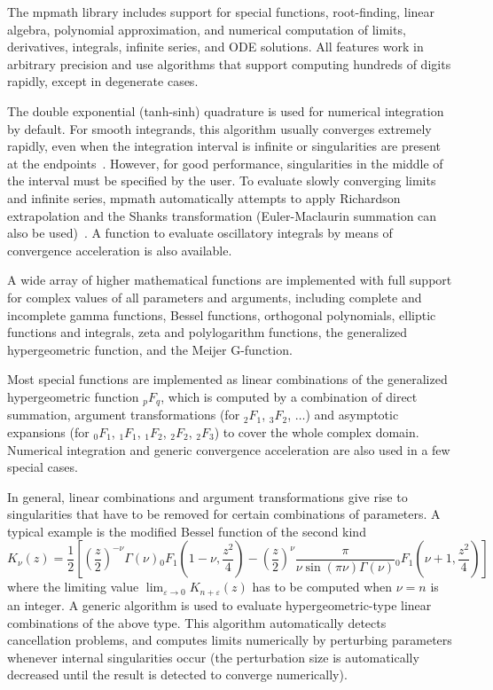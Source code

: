 The mpmath library includes support for
special functions, root-finding, linear algebra, polynomial approximation,
and numerical computation of limits, derivatives, integrals, infinite
series, and ODE solutions. All features work in arbitrary precision
and use algorithms that support computing hundreds of digits rapidly,
except in degenerate cases.

The double exponential (tanh-sinh) quadrature is used for numerical
integration by default. For smooth integrands, this algorithm usually
converges extremely rapidly, even when the integration interval is infinite
or singularities are present at the endpoints~\cite{takahasi1974double,bailey2005comparison}.
However, for good performance, singularities
in the middle of the interval must be specified
by the user.
To evaluate slowly converging limits and infinite series, mpmath
automatically attempts to apply Richardson extrapolation and the
Shanks transformation
(Euler-Maclaurin summation can also be used)~\cite{BenderOrszag1999}.
A function to evaluate oscillatory integrals by means of convergence
acceleration is also available.

A wide array of higher mathematical functions are implemented
with full support for complex values of all parameters and arguments,
including complete and incomplete gamma functions,
Bessel functions, orthogonal polynomials, elliptic functions and integrals,
zeta and polylogarithm functions,
the generalized hypergeometric function, and the Meijer G-function.

Most special functions are implemented as linear 
combinations of the generalized hypergeometric function ${}_pF_q$,
which is computed by a combination of direct summation,
argument transformations (for ${}_2F_1$, ${}_3F_2$, $\ldots$)
and asymptotic expansions
(for ${}_0F_1$, ${}_1F_1$, ${}_1F_2$, ${}_2F_2$, ${}_2F_3$)
to cover the whole complex domain.
Numerical integration and generic convergence acceleration
are also used in a few special cases.

In general, linear combinations and argument transformations
give rise to singularities that have to be removed for certain
combinations of parameters.
A typical example is the modified Bessel function of the second kind
$$K_{\nu}(z) = \frac{1}{2} \left[
            \left(\frac{z}{2}\right)^{-\nu}
                \Gamma(\nu)
                {}_0F_1\!\left(1-\nu, \frac{z^2}{4}\right)
             -
             \left(\frac{z}{2}\right)^{\nu}
                 \frac{\pi}{\nu \sin(\pi \nu) \Gamma(\nu)}
                 {}_0F_1\!\left(\nu+1, \frac{z^2}{4}\right)
            \right]$$
where the limiting value $\lim_{\varepsilon \to 0} K_{n+\varepsilon}(z)$
has to be computed when $\nu = n$ is an integer.
A generic algorithm is used to evaluate
hypergeometric-type linear combinations of the above type.
This algorithm automatically detects cancellation problems,
and computes limits numerically by perturbing parameters whenever
internal singularities occur (the perturbation size is automatically
decreased until the result is detected to converge numerically).

